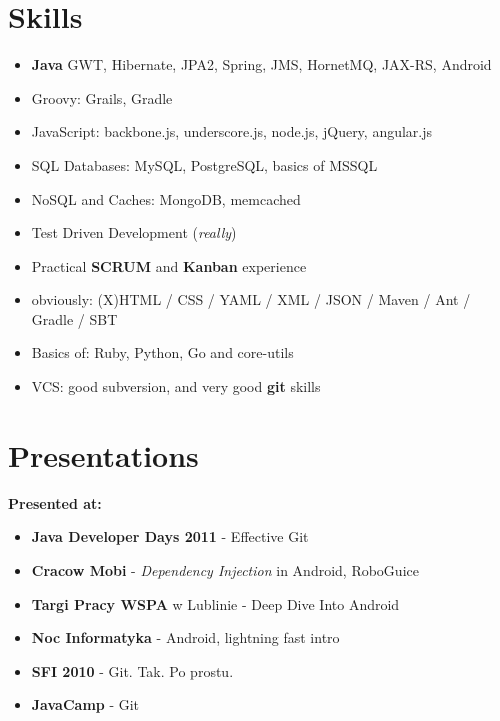 \documentclass{res}
\begin{document}
\begin{resume}
\section{Skills}
\begin{itemize}
 \item \textbf{Java} GWT, Hibernate, JPA2, Spring, JMS, HornetMQ, JAX-RS, Android
 \item Groovy: Grails, Gradle
 \item JavaScript: backbone.js, underscore.js, node.js, jQuery, angular.js
 \item SQL Databases: MySQL, PostgreSQL, basics of MSSQL
 \item NoSQL and Caches: MongoDB, memcached
 \item Test Driven Development (\textit{really})
 \item Practical \textbf{SCRUM} and \textbf{Kanban} experience
 \item obviously: (X)HTML / CSS / YAML / XML / JSON / Maven / Ant / Gradle / SBT
 \item Basics of: Ruby, Python, Go and core-utils
 \item VCS: good subversion, and very good \textbf{git} skills
\end{itemize}

\section{Presentations}
\textbf{Presented at:}
\begin{itemize}
 \item \textbf{Java Developer Days 2011} - Effective Git
 \item \textbf{Cracow Mobi} - \textit{Dependency Injection} in Android, RoboGuice
 \item \textbf{Targi Pracy WSPA} w Lublinie - Deep Dive Into Android
 \item \textbf{Noc Informatyka} - Android, lightning fast intro
 \item \textbf{SFI 2010} - Git. Tak. Po prostu.
 \item \textbf{JavaCamp} - Git
\end{itemize}



\end{resume}
\end{document}
